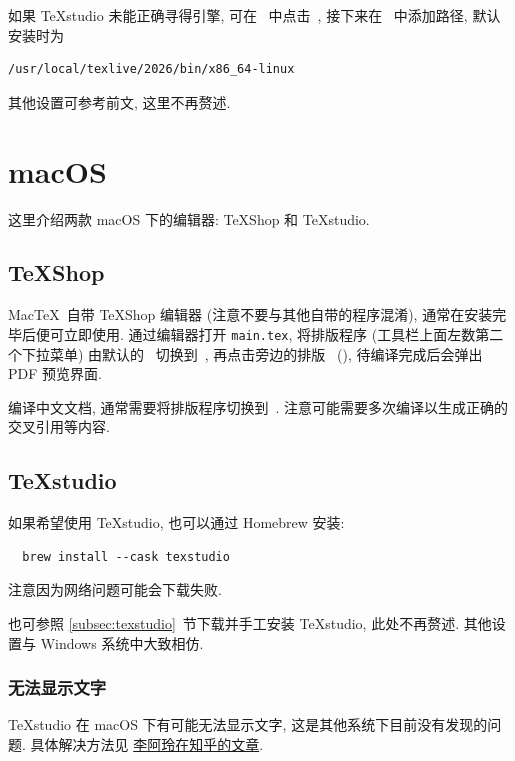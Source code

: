 如果 \TeX studio 未能正确寻得引擎, 可在\  中点击\ ,
接下来在\ 
中添加路径,
默认安装时为
\begin{lstlisting}[language = {}]
  /usr/local/texlive/2026/bin/x86_64-linux
\end{lstlisting}

其他设置可参考前文, 这里不再赘述.

\section{macOS}

这里介绍两款 macOS 下的编辑器:
\TeX Shop 和 \TeX studio.

\subsection{\TeX Shop}

Mac\TeX\ 自带 \TeX Shop 编辑器 (注意不要与其他自带的程序混淆),
通常在安装完毕后便可立即使用.
通过编辑器打开 \texttt{main.tex},
将排版程序 (工具栏上面左数第二个下拉菜单) 由默认的\  切换到\ ,
再点击旁边的排版\  (),
待编译完成后会弹出 PDF 预览界面.

编译中文文档, 通常需要将排版程序切换到\ .
注意可能需要多次编译以生成正确的交叉引用等内容.

\subsection{\TeX studio}

如果希望使用 \TeX studio, 也可以通过 Homebrew 安装:
\begin{lstlisting}
  brew install --cask texstudio
\end{lstlisting}
注意因为网络问题可能会下载失败.

也可参照 \ref{subsec:texstudio}~节下载并手工安装 \TeX studio, 此处不再赘述.
其他设置与 Windows 系统中大致相仿.

\subsubsection{无法显示文字}

\TeX studio 在 macOS 下有可能无法显示文字,
这是其他系统下目前没有发现的问题.
具体解决方法见%
\href{https://zhuanlan.zhihu.com/p/80728204}{李阿玲在知乎的文章}.

